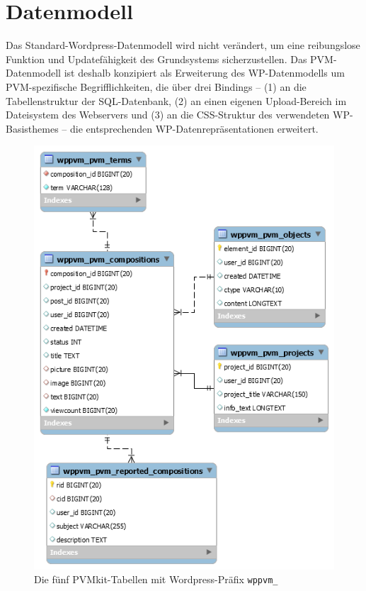 \documentclass[a4paper,11pt]{article}
\begin{document}
\section{Datenmodell}
 
Das Standard-Wordpress-Datenmodell wird nicht verändert, um eine reibungslose
Funktion und Updatefähigkeit des Grundsystems sicherzustellen. Das
PVM-Datenmodell ist deshalb konzipiert als Erweiterung des WP-Datenmodells um
PVM-spezifische Begrifflichkeiten, die über drei Bindings -- (1) an die
Tabellenstruktur der SQL-Datenbank, (2) an einen eigenen Upload-Bereich im
Dateisystem des Webservers und (3) an die CSS-Struktur des verwendeten
WP-Basisthemes -- die entsprechenden WP-Datenrepräsentationen erweitert. 

\begin{figure}[t]
  \begin{center}
    \includegraphics[width=.6\textwidth]{DB-Tabellen.png}
    \caption{Die fünf PVMkit-Tabellen mit Wordpress-Präfix \texttt{wppvm\_}}
  \end{center}
\end{figure}
\end{document}
